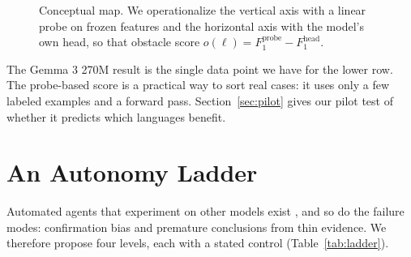 \documentclass[11pt]{article}
\begin{document}
\begin{figure}[t]
\centering
{}
\caption{Conceptual map. We operationalize the vertical axis with a linear probe on frozen features and the horizontal axis with the model's own head, so that obstacle score $o(\ell)=F_1^{\text{probe}}-F_1^{\text{head}}$.}
\label{fig:quad}
\end{figure}

The Gemma 3 270M result \citep{takehi2026weightspace} is the single data point we have for the lower row. The probe-based score is a practical way to sort real cases: it uses only a few labeled examples and a forward pass. Section~\ref{sec:pilot} gives our pilot test of whether it predicts which languages benefit.

\section{An Autonomy Ladder}
\label{sec:ladder}
Automated agents that experiment on other models exist \citep{rottshaham2024maia}, and so do the failure modes: confirmation bias and premature conclusions from thin evidence. We therefore propose four levels, each with a stated control (Table~\ref{tab:ladder}).
\end{document}
